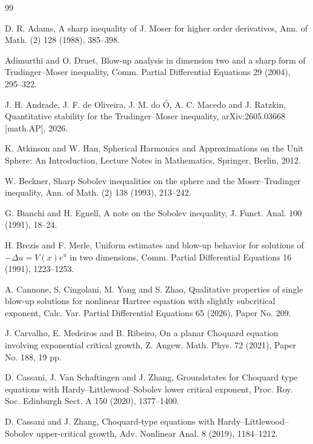 \documentclass[11pt]{article}
\numberwithin{equation}{section}
\begin{document}
\begin{thebibliography}{99}

D. R. Adams,
A sharp inequality of J. Moser for higher order derivatives,
Ann. of Math. (2) 128 (1988), 385--398.

Adimurthi and O. Druet,
Blow-up analysis in dimension two and a sharp form of Trudinger--Moser inequality,
Comm. Partial Differential Equations 29 (2004), 295--322.

J. H. Andrade, J. F. de Oliveira, J. M. do \'{O}, A. C. Macedo and J. Ratzkin,
Quantitative stability for the Trudinger--Moser inequality,
arXiv:2605.03668 [math.AP], 2026.

K. Atkinson and W. Han,
Spherical Harmonics and Approximations on the Unit Sphere: An Introduction,
Lecture Notes in Mathematics, Springer, Berlin, 2012.

W. Beckner,
Sharp Sobolev inequalities on the sphere and the Moser--Trudinger inequality,
Ann. of Math. (2) 138 (1993), 213--242.

G. Bianchi and H. Egnell,
A note on the Sobolev inequality,
J. Funct. Anal. 100 (1991), 18--24.

H. Brezis and F. Merle,
Uniform estimates and blow-up behavior for solutions of \(-\Delta u=V(x)e^{u}\) in two dimensions,
Comm. Partial Differential Equations 16 (1991), 1223--1253.

A. Cannone, S. Cingolani, M. Yang and S. Zhao,
Qualitative properties of single blow-up solutions for nonlinear Hartree equation with slightly subcritical exponent,
Calc. Var. Partial Differential Equations 65 (2026), Paper No. 209.

J. Carvalho, E. Medeiros and B. Ribeiro,
On a planar Choquard equation involving exponential critical growth,
Z. Angew. Math. Phys. 72 (2021), Paper No. 188, 19 pp.

D. Cassani, J. Van Schaftingen and J. Zhang,
Groundstates for Choquard type equations with Hardy--Littlewood--Sobolev lower critical exponent,
Proc. Roy. Soc. Edinburgh Sect. A 150 (2020), 1377--1400.

D. Cassani and J. Zhang,
Choquard-type equations with Hardy--Littlewood--Sobolev upper-critical growth,
Adv. Nonlinear Anal. 8 (2019), 1184--1212.


\end{thebibliography}
\end{document}
